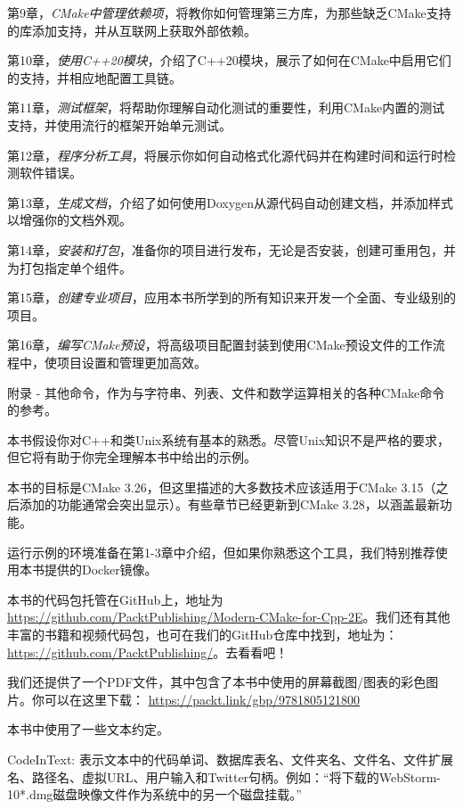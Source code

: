第9章，\textit{CMake中管理依赖项}，将教你如何管理第三方库，为那些缺乏CMake支持的库添加支持，并从互联网上获取外部依赖。

第10章，\textit{使用C++20模块}，介绍了C++20模块，展示了如何在CMake中启用它们的支持，并相应地配置工具链。

第11章，\textit{测试框架}，将帮助你理解自动化测试的重要性，利用CMake内置的测试支持，并使用流行的框架开始单元测试。

第12章，\textit{程序分析工具}，将展示你如何自动格式化源代码并在构建时间和运行时检测软件错误。

第13章，\textit{生成文档}，介绍了如何使用Doxygen从源代码自动创建文档，并添加样式以增强你的文档外观。

第14章，\textit{安装和打包}，准备你的项目进行发布，无论是否安装，创建可重用包，并为打包指定单个组件。

第15章，\textit{创建专业项目}，应用本书所学到的所有知识来开发一个全面、专业级别的项目。

第16章，\textit{编写CMake预设}，将高级项目配置封装到使用CMake预设文件的工作流程中，使项目设置和管理更加高效。

附录 - 其他命令，作为与字符串、列表、文件和数学运算相关的各种CMake命令的参考。


本书假设你对C++和类Unix系统有基本的熟悉。尽管Unix知识不是严格的要求，但它将有助于你完全理解本书中给出的示例。

本书的目标是CMake 3.26，但这里描述的大多数技术应该适用于CMake 3.15（之后添加的功能通常会突出显示）。有些章节已经更新到CMake 3.28，以涵盖最新功能。

运行示例的环境准备在第1-3章中介绍，但如果你熟悉这个工具，我们特别推荐使用本书提供的Docker镜像。


本书的代码包托管在GitHub上，地址为\url{https://github.com/PacktPublishing/Modern-CMake-for-Cpp-2E}。我们还有其他丰富的书籍和视频代码包，也可在我们的GitHub仓库中找到，地址为：\url{https://github.com/PacktPublishing/}。去看看吧！


我们还提供了一个PDF文件，其中包含了本书中使用的屏幕截图/图表的彩色图片。你可以在这里下载： \url{https://packt.link/gbp/9781805121800}


本书中使用了一些文本约定。

CodeInText: 表示文本中的代码单词、数据库表名、文件夹名、文件名、文件扩展名、路径名、虚拟URL、用户输入和Twitter句柄。例如：“将下载的WebStorm-10*.dmg磁盘映像文件作为系统中的另一个磁盘挂载。”


